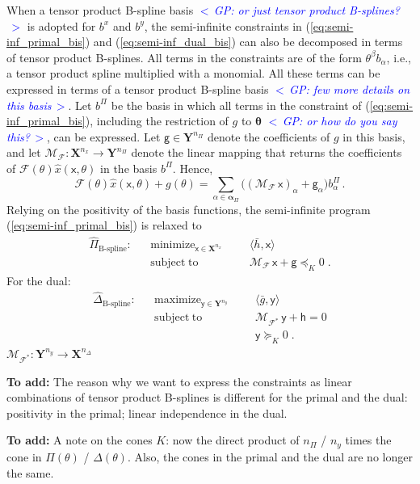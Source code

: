 \documentclass{article}
\DeclareMathOperator*{\minimize}{minimize}
\DeclareMathOperator*{\maximize}{maximize}
\DeclareMathOperator*{\subj}{subject\;to}
\newcommand{\commentGP}[1]{\noindent \textcolor{blue}{\emph{$<\,$GP: #1$\,>$}}}%
\newcommand{\adj}{\ast}                     %
\newcommand{\ppar}{\theta}                          %
\newcommand{\Ppar}{{\bm{\theta}}}                   %
\newcommand{\X}{\mathbf{X}}                         %
\newcommand{\Y}{\mathbf{Y}}                         %
\newcommand{\calF}{\mathcal{F}}                     %
\newcommand{\bx}{b^x}               %
\newcommand{\cx}{\textsf{x}}        %
\newcommand{\nx}{{n_x}}             %
\newcommand{\by}{b^y}               %
\newcommand{\cy}{\textsf{y}}        %
\newcommand{\ny}{{n_y}}             %
\newcommand{\Alpha}{\bm{\alpha}}    %
\newcommand{\meanh}{\bar{h}}        %
\newcommand{\meang}{\bar{g}}        %
\newcommand{\bPi}{b^\Pi}                %
\newcommand{\bPia}{b^\Pi_\alpha}        %
\newcommand{\nPi}{{n_\Pi}}              %
\newcommand{\cg}{\textsf{g}}            %
\newcommand{\cga}{\textsf{g}_\alpha}    %
\newcommand{\nDelta}{{n_\Delta}}        %
\newcommand{\ch}{\textsf{h}}            %
\newcommand{\calMF}{\mathcal{M}_{\mathcal{F}}}
\newcommand{\calMFadj}{\mathcal{M}_{\mathcal{F}^\adj}}
\begin{document}
When a tensor product B-spline basis \commentGP{or just tensor product B-splines?} is adopted for $\bx$ and $\by$, the semi-infinite constraints in (\ref{eq:semi-inf_primal_bis}) and (\ref{eq:semi-inf_dual_bis}) can also be decomposed in terms of tensor product B-splines. All terms in the constraints are of the form $\ppar^\beta b_\alpha$, i.e., a tensor product spline multiplied with a monomial. All these terms can be expressed in terms of a tensor product B-spline basis \commentGP{few more details on this basis}. Let $\bPi$ be the basis in which all terms in the constraint of (\ref{eq:semi-inf_primal_bis}), including the restriction of $g$ to $\Ppar$ \commentGP{or how do you say this?}, can be expressed. Let $\cg\in\Y^\nPi$ denote the coefficients of $g$ in this basis, and let $\calMF:\X^\nx \rightarrow \Y^\nPi$ denote the linear mapping that returns the coefficients of $\calF(\ppar)\hat{x}(\cx,\ppar)$ in the basis $\bPi$. Hence,
\[ \calF(\ppar)\hat{x}(\cx,\ppar) + g(\ppar) = \sum_{\alpha\in\Alpha_\Pi} \big( (\calMF \, \cx)_\alpha + \cga \big) \bPia \,. %
\]
Relying on the positivity of the basis functions, the semi-infinite program (\ref{eq:semi-inf_primal_bis}) is relaxed to
\[\begin{aligned}
\hat{\Pi}_{\text{B-spline}}: && \minimize_{\cx\in\X^\nx} &&& \langle \meanh, \cx \rangle  \\%
                             && \subj                    &&& \calMF \, \cx + \cg \preceq_K 0 \;.%
\end{aligned}\]
For the dual:
\[\begin{aligned}
\hat{\Delta}_{\text{B-spline}}: && \maximize_{\cy\in\Y^\ny} &&& \langle \meang, \cy \rangle \\%
                                && \subj                    &&& \calMFadj\,\cy + \ch = 0 \\%
                                &&                          &&& \cy \succeq_K 0     \;.%
\end{aligned}\]
$\calMFadj:\Y^\ny \rightarrow \X^\nDelta$

\noindent \textbf{To add:} The reason why we want to express the constraints as linear combinations of tensor product B-splines is different for the primal and the dual: positivity in the primal; linear independence in the dual.

\noindent \textbf{To add:} A note on the cones $K$: now the direct product of $\nPi$ / $\ny$ times the cone in $\Pi(\ppar)$ / $\Delta(\ppar)$. Also, the cones in the primal and the dual are no longer the same.
\end{document}
